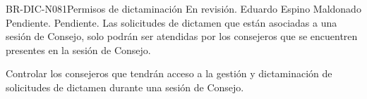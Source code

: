 \begin{BusinessRule}{BR-DIC-N081}{Permisos de dictaminación}
	{\bcAutorization} %
	{\btEnabler}     %
	{\blControlling}     %
	\BRItem[Estado] En revisión.
	 Eduardo Espino Maldonado
	 Pendiente.
	 Pendiente.
	\BRItem[Descripción] Las solicitudes de dictamen que están asociadas a una sesión de Consejo, solo podrán ser atendidas por los consejeros que se encuentren presentes en la sesión de Consejo.
	\BRItem[Sentencia] \cdtEmpty
	
	\BRItem[Motivación] Controlar los consejeros que tendrán acceso a la gestión y dictaminación de solicitudes de dictamen durante una sesión de Consejo.
\end{BusinessRule}


